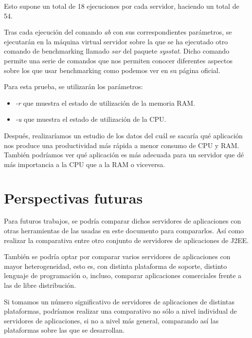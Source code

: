 \documentclass[a4paper, 10pt]{article}
\begin{document}
	Esto supone un total de 18 ejecuciones por cada servidor, haciendo un total de 54.
	
	Tras cada ejecución del comando \textit{ab} con sus correspondientes parámetros, se ejecutarán
	en la máquina virtual servidor sobre la que se ha ejecutado otro comando de benchmarking llamado
	\textit{sar} del paquete \textit{sysstat}. Dicho comando permite una serie de comandos que nos
	permiten conocer diferentes aspectos sobre los que usar benchmarking como podemos ver en su página
	oficial\cite{SAR_official}.
	
	Para esta prueba, se utilizarán los parámetros:
	\begin{itemize}
		\item \textit{-r} que muestra el estado de utilización de la memoria RAM.
		\item \textit{-u} que muestra el estado de utilización de la CPU.
	\end{itemize}
	
	Después, realizaríamos un estudio de los datos del cuál se sacaría qué aplicación nos produce
	una productividad más rápida a menor consumo de CPU y RAM. También podríamos ver qué aplicación
	es más adecuada para un servidor que dé más importancia a la CPU que a la RAM o viceversa.

\section{Perspectivas futuras}
	Para futuros trabajos, se podría comparar dichos servidores de aplicaciones con otras herramientas
	de las usadas en este documento para compararlos. Así como realizar la comparativa entre otro
	conjunto de servidores de aplicaciones de J2EE.
	
	También se podría optar por comparar varios servidores de aplicaciones con mayor heterogeneidad,
	esto es, con distinta plataforma de soporte, distinto lenguaje de programación o, incluso,
	comparar aplicaciones comerciales frente a las de libre distribución.
	
	Si tomamos un número significativo de servidores de aplicaciones de distintas plataformas,
	podríamos realizar una comparativo no sólo a nivel individual de servidores de aplicaciones, si
	no a nivel más general, comparando así las plataformas sobre las que se desarrollan.
	
\end{document}
